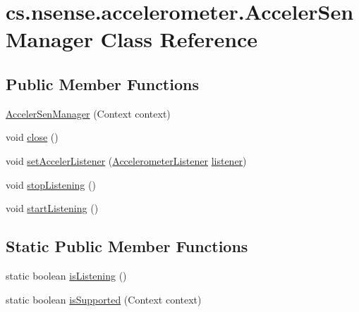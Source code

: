 \hypertarget{classcs_1_1nsense_1_1accelerometer_1_1_acceler_sen_manager}{\section{cs.\-nsense.\-accelerometer.\-Acceler\-Sen\-Manager Class Reference}
\label{classcs_1_1nsense_1_1accelerometer_1_1_acceler_sen_manager}
}
\subsection*{Public Member Functions}
\begin{DoxyCompactItemize}
\item 
\hyperlink{classcs_1_1nsense_1_1accelerometer_1_1_acceler_sen_manager_afb84340fe02a6ce5db5bb8cfa4d15a02}{Acceler\-Sen\-Manager} (Context context)
\item 
void \hyperlink{classcs_1_1nsense_1_1accelerometer_1_1_acceler_sen_manager_abda03508323591b2b88d0084f4c2e5c0}{close} ()
\item 
void \hyperlink{classcs_1_1nsense_1_1accelerometer_1_1_acceler_sen_manager_ace3c45b938c77765fbff9d011998a3ea}{set\-Acceler\-Listener} (\hyperlink{interfacecs_1_1nsense_1_1accelerometer_1_1_accelerometer_listener}{Accelerometer\-Listener} \hyperlink{classcs_1_1nsense_1_1accelerometer_1_1_acceler_sen_manager_a5ffa2f553d7ceb1ff3f0d14d55498aee}{listener})
\item 
void \hyperlink{classcs_1_1nsense_1_1accelerometer_1_1_acceler_sen_manager_a7b610683e1365950e70a8872b070b8cf}{stop\-Listening} ()
\item 
void \hyperlink{classcs_1_1nsense_1_1accelerometer_1_1_acceler_sen_manager_a58196f11332c55d9d5c4c2b60dc6e38f}{start\-Listening} ()
\end{DoxyCompactItemize}
\subsection*{Static Public Member Functions}
\begin{DoxyCompactItemize}
\item 
static boolean \hyperlink{classcs_1_1nsense_1_1accelerometer_1_1_acceler_sen_manager_a36b14ec3ca271e1d579d976d3cab6d0a}{is\-Listening} ()
\item 
static boolean \hyperlink{classcs_1_1nsense_1_1accelerometer_1_1_acceler_sen_manager_a19ae2641c9c8e55337b04065f8cac526}{is\-Supported} (Context context)
\end{DoxyCompactItemize}
